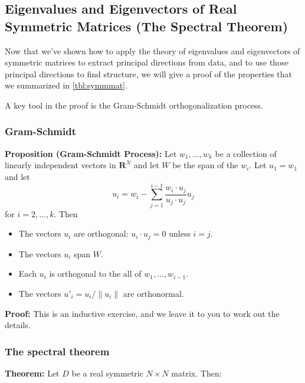 \documentclass[
]{article}
\providecommand{\tightlist}{%
  \setlength{\itemsep}{0pt}\setlength{\parskip}{0pt}}
\begin{document}
\hypertarget{sec:spectraltheorem}{%
\subsection{Eigenvalues and Eigenvectors of Real Symmetric Matrices (The
Spectral Theorem)}\label{sec:spectraltheorem}}

Now that we've shown how to apply the theory of eigenvalues and
eigenvectors of symmetric matrices to extract principal directions from
data, and to use those principal directions to find structure, we will
give a proof of the properties that we summarized in \cref{tbl:symmmat}.

A key tool in the proof is the Gram-Schmidt orthogonalization process.

\hypertarget{sec:gsprocess}{%
\subsubsection{Gram-Schmidt}\label{sec:gsprocess}}

\textbf{Proposition (Gram-Schmidt Process):} Let \(w_{1},\ldots, w_{k}\)
be a collection of linearly independent vectors in \(\mathbf{R}^{N}\)
and let \(W\) be the span of the \(w_{i}\). Let \(u_{1} = w_{1}\) and
let \[
u_{i} = w_{i} - \sum_{j=1}^{i-1} \frac{w_{i}\cdot u_{j}}{u_{j}\cdot u_{j}}u_{j}
\] for \(i=2,\ldots, k\). Then

\begin{itemize}
\tightlist
\item
  The vectors \(u_{i}\) are orthogonal: \(u_{i}\cdot u_{j}=0\) unless
  \(i=j\).
\item
  The vectors \(u_{i}\) span \(W\).
\item
  Each \(u_{i}\) is orthogonal to the all of \(w_{1},\ldots, w_{i-1}\).
\item
  The vectors \(u'_{i} = u_{i}/\|u_{i}\|\) are orthonormal.
\end{itemize}

\textbf{Proof:} This is an inductive exercise, and we leave it to you to
work out the details.

\hypertarget{the-spectral-theorem}{%
\subsubsection{The spectral theorem}\label{the-spectral-theorem}}

\textbf{Theorem:} Let \(D\) be a real symmetric \(N\times N\) matrix.
Then:
\end{document}
